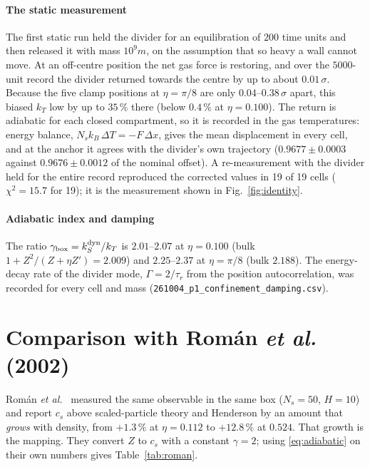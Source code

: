 \documentclass[journal]{IEEEtran}
\begin{document}
\paragraph{The static measurement} The first static run held the divider for an equilibration of
$200$ time units and then released it with mass $10^9 m$, on the assumption that so heavy a wall
cannot move. At an off-centre position the net gas force is restoring, and over the $5000$-unit
record the divider returned towards the centre by up to about $0.01\,\sigma$. Because the five clamp
positions at $\eta = \pi/8$ are only $0.04$--$0.38\,\sigma$ apart, this biased $k_T$ low by up to
$35\,\%$ there (below $0.4\,\%$ at $\eta = 0.100$). The return is adiabatic for each closed
compartment, so it is recorded in the gas temperatures: energy balance,
$N_s k_B\,\Delta T = -F\,\Delta x$, gives the mean displacement in every cell, and at the anchor it agrees
with the divider's own trajectory ($0.9677 \pm 0.0003$ against $0.9676 \pm 0.0012$ of the nominal
offset). A re-measurement with the divider held for the entire record reproduced the corrected
values in 19 of 19 cells ($\chi^2 = 15.7$ for 19); it is the measurement shown in
Fig.~\ref{fig:identity}.

\paragraph{Adiabatic index and damping} The ratio $\gamma_{\rm box} = k_S^{\rm dyn}/k_T$ is
$2.01$--$2.07$ at $\eta = 0.100$ (bulk $1 + Z^2/(Z + \eta Z') = 2.009$) and $2.25$--$2.37$ at $\eta = \pi/8$
(bulk $2.188$). The energy-decay rate of the divider mode, $\Gamma = 2/\tau_r$ from the position
autocorrelation, was recorded for every cell and mass (\texttt{261004\_p1\_confinement\_damping.csv}).

\section{Comparison with Rom\'an \emph{et al.} (2002)}\label{sec:roman}
Rom\'an \emph{et al.}~\cite{roman2002} measured the same observable in the same box ($N_s = 50$,
$H = 10$) and report $c_s$ above scaled-particle theory and Henderson by an amount that \emph{grows}
with density, from $+1.3\,\%$ at $\eta = 0.112$ to $+12.8\,\%$ at $0.524$. That growth is the
mapping. They convert $Z$ to $c_s$ with a constant $\gamma = 2$; using \eqref{eq:adiabatic} on their
own numbers gives Table~\ref{tab:roman}.
\end{document}
